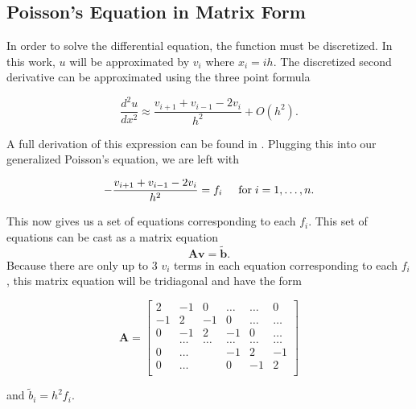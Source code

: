 \documentclass[%
oneside,                 %
final,                   %
10pt]{article}
\begin{document}
\subsection{Poisson's Equation in Matrix Form}

In order to solve the differential equation, the function must be discretized.  In this work, $u$ will be approximated by $v_i$ where $x_i=ih$.  The discretized second derivative can be approximated using the three point formula

\begin{equation*}
\frac{d^2u}{dx^2} \approx \frac{v_{i+1} + v_{i-1} - 2v_i}{h^2} + O(h^2).
\end{equation*}
 
A full derivation of this expression can be found in \cite{LectureNotes}. Plugging this into our generalized Poisson's equation, we are left with

\begin{equation*}
   -\frac{v_{i+1}+v_{i-1}-2v_i}{h^2} = f_i  \hspace{0.5cm} \mathrm{for} \hspace{0.1cm} i=1,\dots, n.
\end{equation*}

This now gives us a set of equations corresponding to each $f_i$.  This set of equations can be cast as a matrix equation
\begin{equation*}
   \mathbf{A}\mathbf{v} = \tilde{\mathbf{b}}.
\end{equation*}
 Because there are only up to 3 $v_i$ terms in each equation corresponding to each $f_i$, this matrix equation will be tridiagonal and have the form

\[
    \mathbf{A} = \begin{bmatrix}
                           2& -1& 0 &\dots   & \dots &0 \\
                           -1 & 2 & -1 &0 &\dots &\dots \\
                           0&-1 &2 & -1 & 0 & \dots \\
                           & \dots   & \dots &\dots   &\dots & \dots \\
                           0&\dots   &  &-1 &2& -1 \\
                           0&\dots    &  & 0  &-1 & 2 \\
                      \end{bmatrix}
\]

and $\tilde{b}_i=h^2f_i$.
\end{document}
